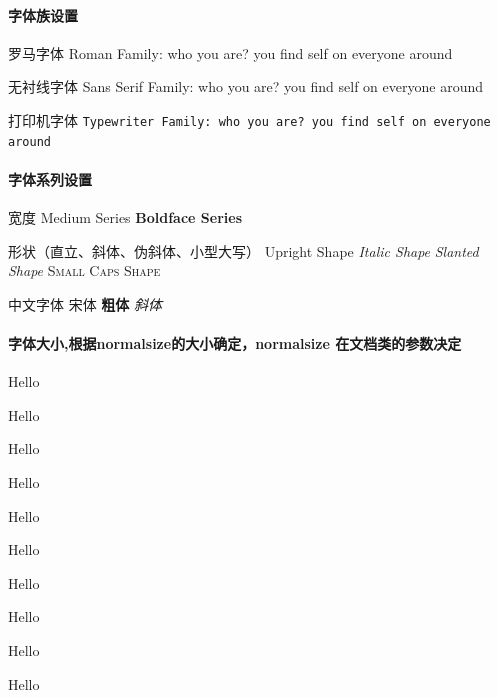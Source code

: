 \paragraph{字体族设置}
\begin{compactenum}
    \item 罗马字体 \textrm{Roman Family: who you are? you find self on everyone around}   
    \item 无衬线字体 \textsf{Sans Serif Family: who you are? you find self on everyone around}
    \item 打印机字体 \texttt{Typewriter Family: who you are? you find self on everyone around}
\end{compactenum}

\paragraph{字体系列设置}
\begin{compactenum}
    \item 宽度 \textmd{Medium Series} \textbf{Boldface Series}
    \item 形状（直立、斜体、伪斜体、小型大写） \textup{Upright Shape} \quad \textit{Italic Shape} \quad \textsl{Slanted Shape} \quad \textsc{Small Caps Shape}
    \item 中文字体 {\songti 宋体}    \textbf{粗体} \textit{斜体}
\end{compactenum}

\paragraph{字体大小,根据normalsize的大小确定，normalsize 在文档类的参数决定}
\begin{compactenum}
    \item \tiny{Hello}
    \item \scriptsize{Hello}
    \item \footnotesize{Hello}
    \item \small{Hello}
    \item \normalsize{Hello}
    \item \large{Hello}
    \item \Large{Hello}
    \item \LARGE{Hello}
    \item \huge{Hello}
    \item \Huge{Hello}
\end{compactenum}


